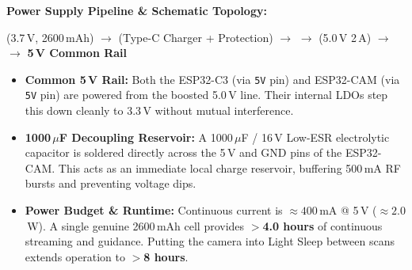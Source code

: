 \documentclass[10pt,a4paper]{article}
\begin{document}
\vspace{0.3em}
\noindent\textbf{Power Supply Pipeline \& Schematic Topology:}
\begin{center}
\small
{} (3.7\,V, 2600\,mAh) 
$\longrightarrow$  (Type-C Charger + Protection) 
$\longrightarrow$  
$\longrightarrow$  (5.0\,V 2\,A) 
$\longrightarrow$  
$\longrightarrow$ \textbf{5\,V Common Rail}
\end{center}

\vspace{-0.4em}
\begin{itemize}
    \item \textbf{Common 5\,V Rail:} Both the ESP32-C3 (via \texttt{5V} pin) and ESP32-CAM (via \texttt{5V} pin) are powered from the boosted 5.0\,V line. Their internal LDOs step this down cleanly to 3.3\,V without mutual interference.
    \item \textbf{1000\,$\mu$F Decoupling Reservoir:} A 1000\,$\mu$F / 16\,V Low-ESR electrolytic capacitor is soldered directly across the 5\,V and GND pins of the ESP32-CAM. This acts as an immediate local charge reservoir, buffering 500\,mA RF bursts and preventing voltage dips.
    \item \textbf{Power Budget \& Runtime:} Continuous current is $\approx 400$\,mA @ 5\,V ($\approx 2.0$\,W). A single genuine 2600\,mAh cell provides \textbf{$>$4.0 hours} of continuous streaming and guidance. Putting the camera into Light Sleep between scans extends operation to \textbf{$>$8 hours}.
\end{itemize}
\end{document}

